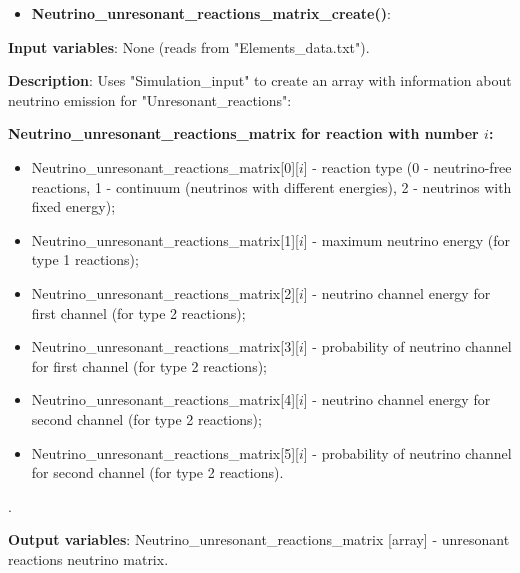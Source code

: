 \documentclass[a4paper,12pt]{article}
\newcommand{\namefunction}[4]{
  \begin{itemize}
    \item \textbf{#1}:
  \end{itemize}
  
  \textbf{Input variables}: #2.
  
  \textbf{Description}: #3.
  
  \textbf{Output variables}: #4.
}
\begin{document}
\vspace{1em}

\namefunction{Neutrino\_unresonant\_reactions\_matrix\_create()}{None (reads from "Elements\_data.txt")}{Uses "Simulation\_input" to create an array with information about neutrino emission for "Unresonant\_reactions":

\textbf{Neutrino\_unresonant\_reactions\_matrix for reaction with number $i$:}
\begin{itemize}
    \item Neutrino\_unresonant\_reactions\_matrix[0][$i$] - reaction type (0 - neutrino-free reactions, 1 - continuum (neutrinos with different energies), 2 - neutrinos with fixed energy);
    \item Neutrino\_unresonant\_reactions\_matrix[1][$i$] - maximum neutrino energy (for type 1 reactions);
    \item Neutrino\_unresonant\_reactions\_matrix[2][$i$] - neutrino channel energy for first channel (for type 2 reactions);
    \item Neutrino\_unresonant\_reactions\_matrix[3][$i$] - probability of neutrino channel for first channel (for type 2 reactions);
    \item Neutrino\_unresonant\_reactions\_matrix[4][$i$] - neutrino channel energy for second channel (for type 2 reactions);
    \item Neutrino\_unresonant\_reactions\_matrix[5][$i$] - probability of neutrino channel for second channel (for type 2 reactions).
\end{itemize}


}{Neutrino\_unresonant\_reactions\_matrix [array] - unresonant reactions neutrino matrix}

\vspace{1em}
\end{document}
